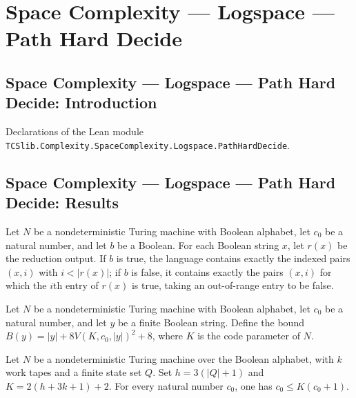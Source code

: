\section{Space Complexity --- Logspace --- Path Hard Decide}
\subsection*{Space Complexity --- Logspace --- Path Hard Decide: Introduction}

Declarations of the Lean module \texttt{TCSlib.Complexity.SpaceComplexity.Logspace.PathHardDecide}.

\subsection*{Space Complexity --- Logspace --- Path Hard Decide: Results}

\begin{definition}
\label{Complexity.PathHard.qLang}
\leanok
{}
Let $N$ be a nondeterministic Turing machine with Boolean alphabet, let $c_0$ be a
natural number, and let $b$ be a Boolean. For each Boolean string $x$, let $r(x)$ be the
reduction output. If $b$ is true, the language contains exactly the indexed pairs
$(x,i)$ with $i<|r(x)|$; if $b$ is false, it contains exactly the pairs $(x,i)$ for
which the $i$th entry of $r(x)$ is true, taking an out-of-range entry to be false.
\end{definition}

\begin{definition}
\label{Complexity.PathHard.qBnd}
\leanok
{}
Let $N$ be a nondeterministic Turing machine with Boolean alphabet, let $c_0$ be a
natural number, and let $y$ be a finite Boolean string. Define the bound
$B(y)=|y|+8V(K,c_0,|y|)^2+8$, where $K$ is the code parameter of $N$.
\end{definition}

\begin{lemma}
\leanok
{}
Let $N$ be a nondeterministic Turing machine over the Boolean alphabet, with $k$ work
tapes and a finite state set $Q$. Set $h=3(|Q|+1)$ and $K=2(h+3k+1)+2$. For every
natural number $c_0$, one has $c_0\le K(c_0+1)$.
\end{lemma}

